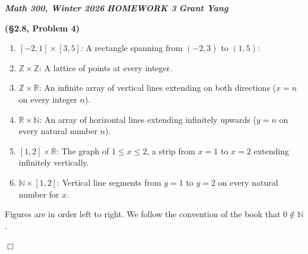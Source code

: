 \documentclass[12pt]{article}
\theoremstyle{definition}
\newenvironment{Solution}{\noindent {\sc Solution.}}{$\Box$ \vspace{2 ex}}
\begin{document}
\noindent \textit{\textbf{Math 300, Winter 2026}} \hspace{1.3cm} \textit{\textbf{HOMEWORK 3}} \hspace{1.3cm} 
\textit{\textbf{Grant Yang}
} 

\vspace{0.5cm}

\begin{Solution}
{\bf (\S2.8, Problem 4)}\\
\begin{enumerate}
    \item $[-2,1]\times[3,5]$: A rectangle spanning from $(-2,3)$ to $(1,5)$:
    \item $\mathbb Z \times \mathbb Z$: A lattice of points at every integer.
    \item $\mathbb Z \times \mathbb R$: An infinite array of vertical lines extending on both directions ($x=n$ on every integer $n$).
    \item $\mathbb R \times \mathbb N$: An array of horizontal lines extending infinitely upwards ($y=n$ on every natural number $n$).
    \item $[1,2]\times \mathbb R$: The graph of $1\le x \le 2$, a strip from $x=1$ to $x=2$ extending infinitely vertically.
    \item $\mathbb N \times [1,2]$: Vertical line segments from $y=1$ to $y=2$ on every natural number for $x$.
\end{enumerate}
Figures are in order left to right. We follow the convention of the book that $0 \not \in \mathbb N$.

\end{Solution}
\end{document}
